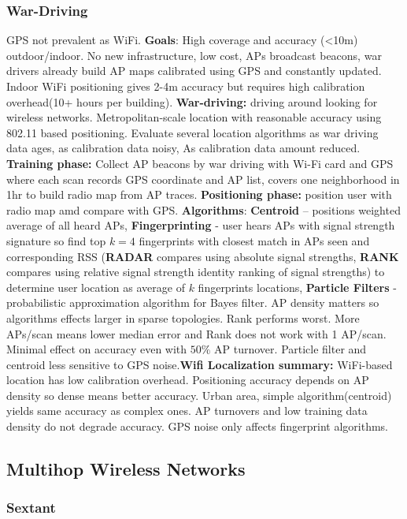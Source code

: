 \documentclass[9pt]{extarticle}
\begin{document}
\begin{multicols}{2}
\subsubsection{War-Driving}

GPS not prevalent as WiFi. \textbf{Goals}: High coverage and accuracy (<10m) outdoor/indoor. No new infrastructure, low cost, APs broadcast beacons, war drivers already build AP maps calibrated using GPS and constantly updated. Indoor WiFi positioning gives 2-4m accuracy but requires high calibration overhead(10+ hours per building). \textbf{War-driving:} driving around looking for wireless networks. Metropolitan-scale location with reasonable accuracy using 802.11 based positioning. Evaluate several location algorithms as war driving data ages, as calibration data noisy, As calibration data amount reduced. \textbf{Training phase: }Collect AP beacons by war driving with Wi-Fi card and GPS where each scan records GPS coordinate and AP list, covers one neighborhood in 1hr to build radio map from AP traces. \textbf{Positioning phase:} position user with radio map amd compare with GPS. \textbf{Algorithms}: \textbf{Centroid} – positions weighted average of all heard APs, \textbf{Fingerprinting} - user hears APs with signal strength signature so find top $k=4$ fingerprints with closest match in APs seen and corresponding RSS (\textbf{RADAR} compares using absolute signal strengths, \textbf{RANK} compares using relative signal strength identity ranking of signal strengths) to determine user location as average of $k$ fingerprints locations, \textbf{Particle Filters} - probabilistic approximation algorithm for Bayes filter. AP density matters so algorithms effects larger in sparse topologies. Rank performs worst. More APs/scan means lower median error and Rank does not work with 1 AP/scan. Minimal effect on accuracy even with $50\%$ AP turnover. Particle filter and centroid less sensitive to GPS noise.\textbf{Wifi Localization summary:} WiFi-based location has low calibration overhead. Positioning accuracy depends on AP density so dense means better accuracy. Urban area, simple algorithm(centroid) yields same accuracy as complex ones. AP turnovers and low training data density do not degrade accuracy. GPS noise only affects fingerprint algorithms.

\subsection{Multihop Wireless Networks}

\subsubsection{Sextant}


\end{multicols}
\end{document}

